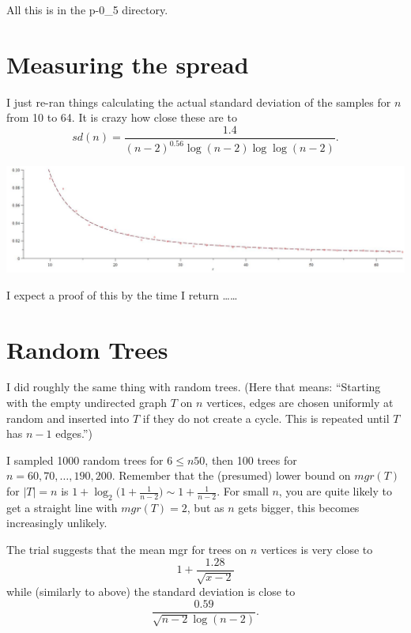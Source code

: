 \documentclass[12pt]{article}
\begin{document}
All this is in the p-0\_5 directory.

\section*{Measuring the spread}

I just re-ran things calculating the actual standard deviation of the samples for $n$ from 10 to 64. It is crazy how close these are to
  \[ sd(n) = \frac{1.4}{(n-2)^{0.56} \log(n-2) \log \log (n-2)}. \]
  
\begin{center}
\includegraphics[width=15cm]{max-min-sd.jpg}
\end{center}

I expect a proof of this by the time I return \dots \dots

\section*{Random Trees}

I did roughly the same thing with random trees. (Here that means: ``Starting with the empty undirected graph $T$ on $n$ vertices, edges are chosen uniformly at random and inserted into $T$ if they do not create a cycle.  This is repeated until $T$ has $n-1$ edges.'')

I sampled 1000 random trees for $6 \le n 50$, then 100 trees for $n = 60, 70, \dots, 190, 200$.  Remember that the (presumed) lower bound on $mgr(T)$ for $|T| = n$ is $1+ \log_2\bigl(1+\frac{1}{n-2}\bigr) \sim 1 + \frac{1}{n-2}$. For small $n$, you are quite likely to get a straight line with $mgr(T) = 2$, but as $n$ gets bigger, this becomes increasingly unlikely.

The trial suggests that the mean mgr for trees on $n$ vertices is very close to
  \[ 1+\frac{1.28}{\sqrt{x-2}} \]
while (similarly to above) the standard deviation is close to
 \[ \frac{0.59}{\sqrt{n-2} \log(n-2)} .\]
 
\end{document}

